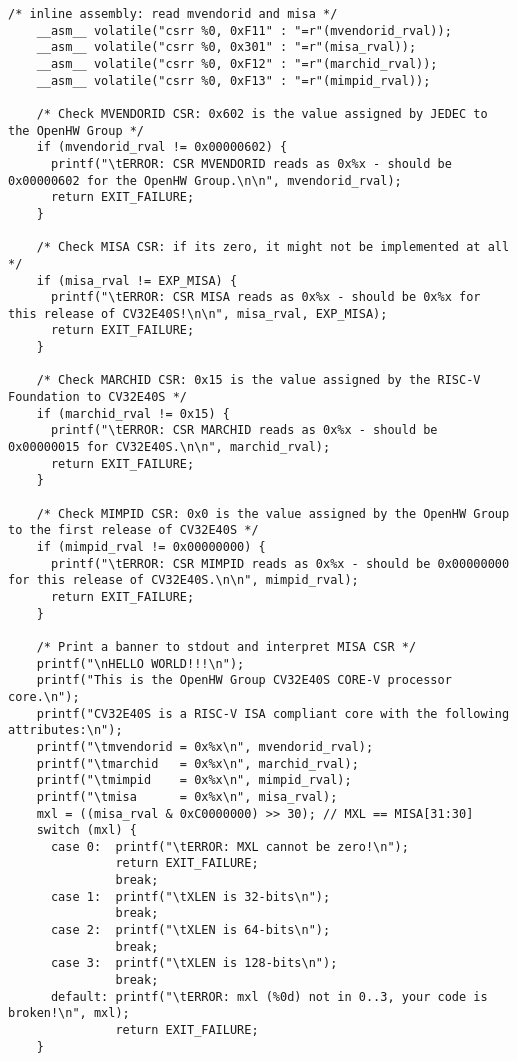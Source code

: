 \begin{lstlisting}[caption={A sample C++ code}, label=lst:sample_code]
    /* inline assembly: read mvendorid and misa */
    __asm__ volatile("csrr %0, 0xF11" : "=r"(mvendorid_rval));
    __asm__ volatile("csrr %0, 0x301" : "=r"(misa_rval));
    __asm__ volatile("csrr %0, 0xF12" : "=r"(marchid_rval));
    __asm__ volatile("csrr %0, 0xF13" : "=r"(mimpid_rval));

    /* Check MVENDORID CSR: 0x602 is the value assigned by JEDEC to the OpenHW Group */
    if (mvendorid_rval != 0x00000602) {
      printf("\tERROR: CSR MVENDORID reads as 0x%x - should be 0x00000602 for the OpenHW Group.\n\n", mvendorid_rval);
      return EXIT_FAILURE;
    }

    /* Check MISA CSR: if its zero, it might not be implemented at all */
    if (misa_rval != EXP_MISA) {
      printf("\tERROR: CSR MISA reads as 0x%x - should be 0x%x for this release of CV32E40S!\n\n", misa_rval, EXP_MISA);
      return EXIT_FAILURE;
    }

    /* Check MARCHID CSR: 0x15 is the value assigned by the RISC-V Foundation to CV32E40S */
    if (marchid_rval != 0x15) {
      printf("\tERROR: CSR MARCHID reads as 0x%x - should be 0x00000015 for CV32E40S.\n\n", marchid_rval);
      return EXIT_FAILURE;
    }

    /* Check MIMPID CSR: 0x0 is the value assigned by the OpenHW Group to the first release of CV32E40S */
    if (mimpid_rval != 0x00000000) {
      printf("\tERROR: CSR MIMPID reads as 0x%x - should be 0x00000000 for this release of CV32E40S.\n\n", mimpid_rval);
      return EXIT_FAILURE;
    }

    /* Print a banner to stdout and interpret MISA CSR */
    printf("\nHELLO WORLD!!!\n");
    printf("This is the OpenHW Group CV32E40S CORE-V processor core.\n");
    printf("CV32E40S is a RISC-V ISA compliant core with the following attributes:\n");
    printf("\tmvendorid = 0x%x\n", mvendorid_rval);
    printf("\tmarchid   = 0x%x\n", marchid_rval);
    printf("\tmimpid    = 0x%x\n", mimpid_rval);
    printf("\tmisa      = 0x%x\n", misa_rval);
    mxl = ((misa_rval & 0xC0000000) >> 30); // MXL == MISA[31:30]
    switch (mxl) {
      case 0:  printf("\tERROR: MXL cannot be zero!\n");
               return EXIT_FAILURE;
               break;
      case 1:  printf("\tXLEN is 32-bits\n");
               break;
      case 2:  printf("\tXLEN is 64-bits\n");
               break;
      case 3:  printf("\tXLEN is 128-bits\n");
               break;
      default: printf("\tERROR: mxl (%0d) not in 0..3, your code is broken!\n", mxl);
               return EXIT_FAILURE;
    }


\end{lstlisting}
